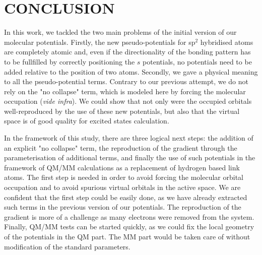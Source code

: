 \documentclass[12pt]{article}
\begin{document}
\section*{\sffamily \Large CONCLUSION}
In this work, we tackled the two main problems of the initial version of our
molecular potentials.
Firstly, the new pseudo-potentials for sp$^2$ hybridised
atoms are completely atomic and, even if the directionality of the bonding pattern
has to be fullfilled by correctly positioning the \(s\) potentials, no potentials need to
be added relative to the position of two atoms.
Secondly, we gave a physical meaning to all the pseudo-potential
terms.
Contrary to our previous attempt, we do not rely on the "no collapse" term,
which is modeled here by forcing the molecular occupation (\emph{vide infra}).
We could show that not only were the occupied orbitals well-reproduced
by the use of these new potentials, but also that the virtual space is of good quality
for excited states calculation.

In the framework of this study, there are three logical next steps: the addition of an explicit
"no collapse" term, the reproduction of the gradient through the parameterisation
of additional terms, and finally the use of such potentials in the framework
of QM/MM calculations as a replacement of hydrogen based link atoms.
The first step is needed in order to avoid forcing the molecular orbital occupation and
to avoid spurious virtual orbitals in the active space.
We are confident that the first step could be easily done, as we have already extracted such
terms in the previous version of our potentials.
The reproduction of the gradient is more of a challenge as many electrons were removed from the system.
Finally, QM/MM tests can be started quickly, as we could fix the local geometry of the potentials
in the QM part. The MM part would be taken care of without modification of the standard parameters.

\clearpage



%
%
\end{document}
